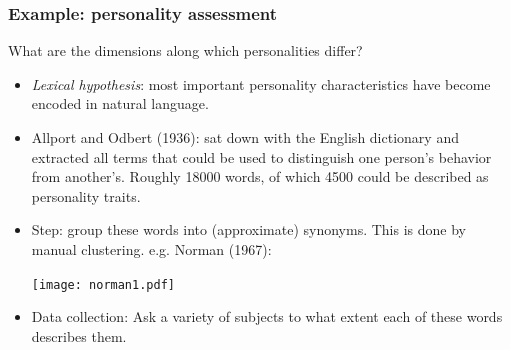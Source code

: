 \documentclass[smaller]{beamer}
\def\R{{\mathbb R}}
\def\darkgreen{\color{green!60!black}}
\def\R{{\mathbb R}}
\begin{document}

\begin{frame}
\frametitle{Example: personality assessment}

\alert{What are the dimensions along which personalities differ?}
\begin{itemize}
\item<2-> {\it Lexical hypothesis}: most important personality characteristics have become encoded in natural language.
\item<3-> Allport and Odbert (1936): sat down with the English dictionary and extracted all terms that could be used to distinguish one person's behavior from another's. Roughly 18000 words, of which 4500 could be described as personality traits.
\item<4-> Step: group these words into (approximate) synonyms. This is done by manual clustering. e.g. Norman (1967):

\begin{center}
\texttt{[image: norman1.pdf]}
\end{center}

\item<5-> Data collection: Ask a variety of subjects to what extent each of these words describes them.
\end{itemize}
\end{frame}
\end{document}
